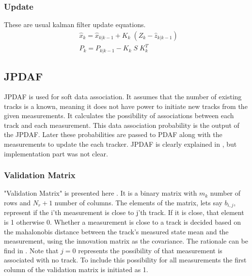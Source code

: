 \documentclass[peerreview]{IEEEtran}
\begin{document}
\vspace{10px}

\subsubsection{Update}
These are usual kalman filter update equations.
\begin{equation}
\begin{aligned}
&\hat{x}_k = \hat{x}_{k|k-1} + K_k \; (Z_k - \hat{z}_{k|k-1}) \\
&P_k = P_{k|k-1} - K_k \; S \; K_k^T
\end{aligned}
\end{equation}

\vspace{10px}

\subsection{JPDAF}
 JPDAF is used for soft data association. It assumes that the number of existing tracks is a known, meaning it does not have power to initiate new tracks from the given measurements. It calculates the possibility of associations between each track and each measurement. This data association probability is the output of the JPDAF. Later these probabilities are passed to PDAF along with the measurements to update the each tracker. JPDAF is clearly explained in \cite{BYL95}, but implementation part was not clear.

\vspace{10px}

\subsubsection{Validation Matrix}
"Validation Matrix" is presented here \cite[p.312]{BYL95}. It is a binary matrix with $m_k$ number of rows and $N_r+1$ number of columns. The elements of the matrix, lets say $b_{i,j}$, represent if the i'th measurement is close to j'th track. If it is close, that element is 1 otherwise 0. Whether a measurement is close to a track is decided based on the mahalonobis distance between the track's measured state mean and the measurement, using the innovation matrix as the covariance. The rationale can be find in \cite[p.312]{BYL95}. Note that $j=0$ represents the possibility of that measurement is associated with no track. To include this possibility for all measurements the first column of the validation matrix is initiated as 1.
\end{document}

